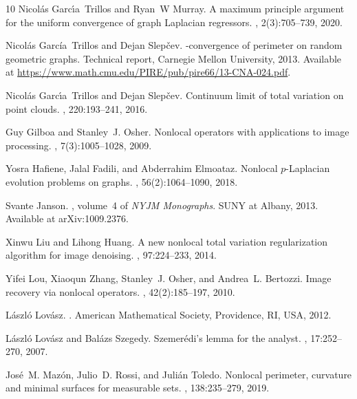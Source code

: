 \documentclass[11pt]{amsart}
\numberwithin{equation}{section}
\begin{document}
\begin{thebibliography}{10}
Nicol{\'a}s Garc{\'\i}a~Trillos and Ryan~W Murray.
\newblock A maximum principle argument for the uniform convergence of graph
  {L}aplacian regressors.
, 2(3):705--739, 2020.

Nicol{\'a}s Garc{\'i}a~Trillos and Dejan Slep{\v{c}}ev.
\newblock {$\Gamma$}-convergence of perimeter on random geometric graphs.
\newblock Technical report, Carnegie Mellon University, 2013.
\newblock Available at
  \url{https://www.math.cmu.edu/PIRE/pub/pire66/13-CNA-024.pdf}.

Nicol{\'a}s Garc{\'\i}a~Trillos and Dejan Slep{\v{c}}ev.
\newblock Continuum limit of total variation on point clouds.
, 220:193--241, 2016.

Guy Gilboa and Stanley~J. Osher.
\newblock Nonlocal operators with applications to image processing.
, 7(3):1005--1028, 2009.

Yosra Hafiene, Jalal Fadili, and Abderrahim Elmoataz.
\newblock Nonlocal $p$-{L}aplacian evolution problems on graphs.
, 56(2):1064--1090, 2018.

Svante Janson.
,
  volume~4 of {\em NYJM Monographs}.
\newblock SUNY at Albany, 2013.
\newblock Available at arXiv:1009.2376.

Xinwu Liu and Lihong Huang.
\newblock A new nonlocal total variation regularization algorithm for image
  denoising.
, 97:224--233, 2014.

Yifei Lou, Xiaoqun Zhang, Stanley~J. Osher, and Andrea~L. Bertozzi.
\newblock Image recovery via nonlocal operators.
, 42(2):185--197, 2010.

L{\'a}szl{\'o} Lov{\'a}sz.
.
\newblock American Mathematical Society, Providence, RI, USA, 2012.

L{\'a}szl{\'o} Lov{\'a}sz and Bal{\'a}zs Szegedy.
\newblock Szemer{\'e}di’s lemma for the analyst.
, 17:252--270, 2007.

Jos{\'e}~M. Maz{\'o}n, Julio~D. Rossi, and Juli{\'a}n Toledo.
\newblock Nonlocal perimeter, curvature and minimal surfaces for measurable
  sets.
, 138:235--279, 2019.


\end{thebibliography}
\end{document}
